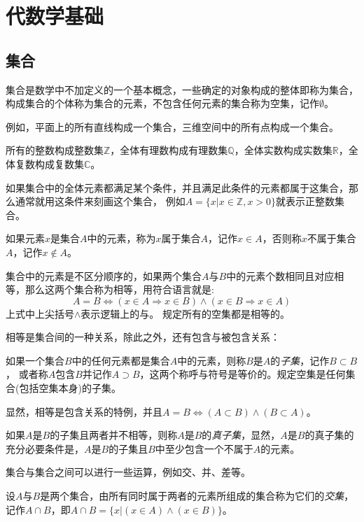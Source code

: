 \section{代数学基础}
\label{sec:algebra-base}

\subsection{集合}
\label{sec:set}

集合是数学中不加定义的一个基本概念，一些确定的对象构成的整体即称为集合，构成集合的个体称为集合的元素，不包含任何元素的集合称为空集，记作$\emptyset$。

例如，平面上的所有直线构成一个集合，三维空间中的所有点构成一个集合。

所有的整数构成整数集$\mathbb{Z}$，全体有理数构成有理数集$\mathbb{Q}$，全体实数构成实数集$\mathbb{R}$，全体复数构成复数集$\mathbb{C}$。

如果集合中的全体元素都满足某个条件，并且满足此条件的元素都属于这集合，那么通常就用这条件来刻画这个集合，
例如$A=\{ x | x \in \mathbb{Z}, x>0 \}$就表示正整数集合。

如果元素$x$是集合$A$中的元素，称为$x$属于集合$A$，记作$x \in A$，否则称$x$不属于集合$A$，记作$x \notin A$。

集合中的元素是不区分顺序的，如果两个集合$A$与$B$中的元素个数相同且对应相等，那么这两个集合称为相等，用符合语言就是:
\[ A = B \Leftrightarrow (x \in A \Rightarrow x \in B) \land (x \in B \Rightarrow x \in A) \]
上式中上尖括号$\land$表示逻辑上的与。
 规定所有的空集都是相等的。

 相等是集合间的一种关系，除此之外，还有包含与被包含关系：
 \begin{definition}
   如果一个集合$B$中的任何元素都是集合$A$中的元素，则称$B$是$A$的\emph{子集}，记作$B \subset B$，
   或者称$A$包含$B$并记作$A \supset B$，这两个称呼与符号是等价的。规定空集是任何集合(包括空集本身)的子集。
 \end{definition}

 显然，相等是包含关系的特例，并且$A=B \Leftrightarrow (A \subset B) \land (B \subset A)$。

 如果$A$是$B$的子集且两者并不相等，则称$A$是$B$的\emph{真子集}，显然，$A$是$B$的真子集的充分必要条件是，$A$是$B$的子集且$B$中至少包含一个不属于$A$的元素。
 
集合与集合之间可以进行一些运算，例如交、并、差等。
\begin{definition}
  设$A$与$B$是两个集合，由所有同时属于两者的元素所组成的集合称为它们的\emph{交集}，记作$A \cap B$，即$A \cap B = \{ x | (x \in A) \land (x \in B) \}$。
\end{definition}

